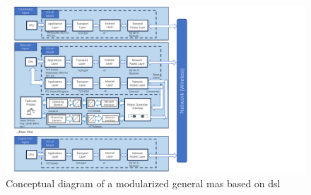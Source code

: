 \begin{figure}[htb]
    \includegraphics[width=\textwidth]{figures/DSLConceptual.pdf}
    
    \centering
    \caption{Conceptual diagram of a modularized general \gls{mas} based on \gls{dsl} \label{fig: DSLConceptual}}
\end{figure}
